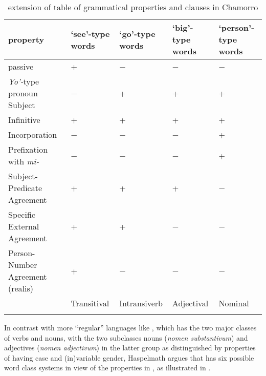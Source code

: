 \documentclass[output=paper]{langsci/langscibook}
\begin{document}
\begin{table}[htpb]
\centering
{\small
\begin{tabularx}{\textwidth}{lXXXX}
\lsptoprule
property                        & ‘see’-type words & ‘go’-type words & ‘big’-type words & ‘person’-type words\\
\midrule
passive                         & +                & −               & −                & −\\
\emph{Yo’-}type pronoun Subject & −                & +               & +                & +\\
Infinitive                      & +                & +               & +                & +\\
Incorporation                   & −                & −               & −                & +\\
Prefixation with \emph{mi-}     & −                & −               & −                & +\\
Subject-Predicate Agreement     & +                & +               & +                & −\\
Specific External Agreement     & +                & +               & −                & −\\
Person-Number Agreement (realis) & +                & −               & −                & −\\
                                & Transitival                     & Intransiverb     & Adjectival      & Nominal\\
\lspbottomrule
\end{tabularx}
}
\caption{ extension of  table of
\mbox{grammatical} properties and clauses in Chamorro}\label{tab:key:27.1}
\end{table}

In contrast with more \enquote{regular} languages like , which has
the two major classes of verbs and nouns, with the two subclasses nouns
(\emph{nomen substantivum}) and adjectives (\emph{nomen adjectivum}) in the
latter group as distinguished by properties of having case and (in)variable
gender, Haspelmath argues that  has six possible word class
systems in view of the properties in , as illustrated in
.
\end{document}
